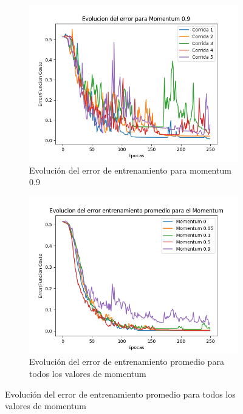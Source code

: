 \begin{figure}[!htbp]
\centering
\begin{subfigure}{.5\textwidth}
  \centering
  \includegraphics[width=1\linewidth]{graficos/momentum_0_9.png}
  \caption{Evolución del error de entrenamiento para momentum 0.9}
  \label{fig:sub1}
\end{subfigure}%
\begin{subfigure}{.5\textwidth}
  \centering
  \includegraphics[width=1\linewidth]{graficos/momentum_promedios_entrenamiento.png}
  \caption{Evolución del error de entrenamiento promedio para todos los valores de momentum}
  \label{fig:sub2}
\end{subfigure}
\end{figure}

